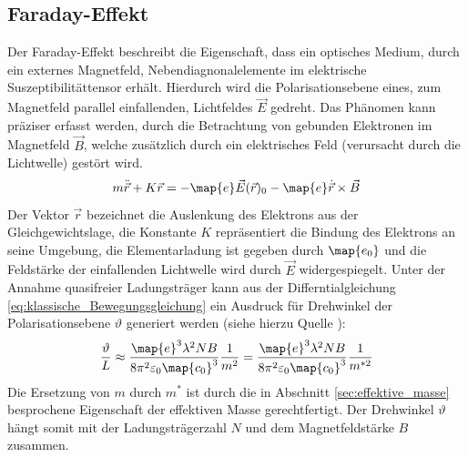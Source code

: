 \subsection{Faraday-Effekt}
Der Faraday-Effekt beschreibt die Eigenschaft, dass ein optisches
Medium, durch ein externes Magnetfeld, Nebendiagnonalelemente im elektrische Suszeptibilitättensor
erhält. Hierdurch wird die Polarisationsebene eines, zum Magnetfeld parallel
einfallenden, Lichtfeldes $\vec{E}$ gedreht. Das Phänomen kann präziser erfasst werden,
durch die Betrachtung von gebunden Elektronen im Magnetfeld $\vec{B}$, welche
zusätzlich durch ein elektrisches Feld (verursacht durch die Lichtwelle) gestört wird.
\begin{equation}
  \label{eq:klassische_Bewegungsgleichung}
  m\ddot{\vec{r}}+K\vec{r}=-\map{e}\vec{E}(\vec{r})_0-\map{e}\dot{\vec{r}}\times\vec{B}
\end{equation}
Der Vektor $\vec{r}$ bezeichnet die Auslenkung des Elektrons aus der Gleichgewichtslage,
die Konstante $K$ repräsentiert die Bindung des Elektrons an seine Umgebung, die Elementarladung
ist gegeben durch $\map{e_0}$ und die Feldstärke der einfallenden Lichtwelle
wird durch $\vec{E}$ widergespiegelt.
Unter der Annahme quasifreier Ladungsträger kann
aus der Differntialgleichung \eqref{eq:klassische_Bewegungsgleichung} ein Ausdruck
für Drehwinkel der Polarisationsebene $\vartheta$ generiert werden (siehe hierzu Quelle \cite{anleitungv46}):
\begin{equation}
  \label{eq:drehwinkel}
  \frac{\vartheta}{L}\approx \frac{\map{e}^3\lambda^2 NB}{8\pi^2\varepsilon_0\map{c_0}^3}\frac{1}{m^2} = \frac{\map{e}^3\lambda^2 NB}{8\pi^2\varepsilon_0\map{c_0}^3}\frac{1}{m^{*2}}
\end{equation}
Die Ersetzung von $m$ durch $m^*$ ist durch die in Abschnitt \ref{sec:effektive_masse}
besprochene Eigenschaft der effektiven Masse gerechtfertigt. Der Drehwinkel $\vartheta$ hängt somit
mit der Ladungsträgerzahl $N$ und dem Magnetfeldstärke $B$ zusammen.
